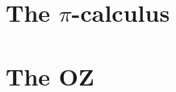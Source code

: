

\section{The \texorpdfstring{$\pi$}{pi}-calculus}
\label{sec_pi_calculus}


\section{The OZ}
\label{sec_oz}



